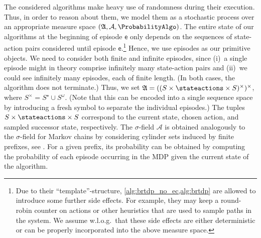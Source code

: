 \documentclass{theoretics}
\newcommand{\unionSym}{\cup}
\newcommand{\unionBin}{\mathbin{\unionSym}}
\newcommand{\union}{\unionBin}
\newcommand{\States}{S}
\newcommand{\algoepisode}{\mathsf{e}}
\newcommand{\algorithmspace}{\mathfrak{A}}
\newcommand{\algorithmsigma}{\mathcal{A}}
\begin{document}
The considered algorithms make heavy use of randomness during their execution.
Thus, in order to reason about them, we model them as a stochastic process over an appropriate measure space $(\algorithmspace, \algorithmsigma, \ProbabilityAlgo)$.
The entire state of our algorithms at the beginning of episode $\algoepisode$ only depends on the sequences of state-action pairs considered until episode $\algoepisode$.\footnote{Due to their \enquote{template}-structure, \cref{alg:brtdp_no_ec,alg:brtdp} are allowed to introduce some further side effects.
For example, they may keep a round-robin counter on actions or other heuristics that are used to sample paths in the system.
We assume w.l.o.g.\ that these side effects are either deterministic or can be properly incorporated into the above measure space.}
Hence, we use episodes as our primitive objects.
We need to consider both finite and infinite episodes, since (i)~a single episode might in theory comprise infinitely many state-action pairs and (ii)~we could see infinitely many episodes, each of finite length.
(In both cases, the algorithm does not terminate.)
Thus, we set $\algorithmspace = ((\States \times \stateactions \times \States)^\times)^\times$, where $S^\times = S^\star \union S^\omega$.
(Note that this can be encoded into a single sequence space by introducing a fresh symbol to separate the individual episodes.)
The tuples $\States \times \stateactions \times \States$ correspond to the current state, chosen action, and sampled successor state, respectively.
The $\sigma$-field $\algorithmsigma$ is obtained analogously to the $\sigma$-field for Markov chains by considering cylinder sets induced by finite prefixes, see \cite[Section~2.1.6]{DBLP:books/wi/Puterman94}.
For a given prefix, its probability can be obtained by computing the probability of each episode occurring in the MDP given the current state of the algorithm.
\end{document}
